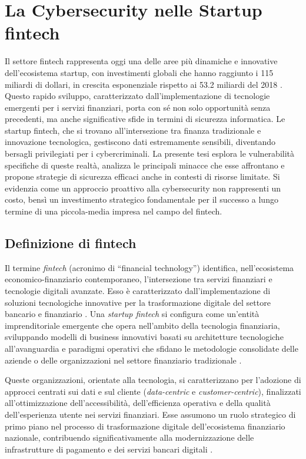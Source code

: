 \section{La Cybersecurity nelle Startup fintech}

Il settore fintech rappresenta oggi una delle aree più dinamiche e innovative dell'ecosistema startup, con investimenti globali che hanno raggiunto i 115 miliardi di dollari, in crescita esponenziale rispetto ai 53.2 miliardi del 2018 \cite{gartnerfintech}. Questo rapido sviluppo, caratterizzato dall'implementazione di tecnologie emergenti per i servizi finanziari, porta con sé non solo opportunità senza precedenti, ma anche significative sfide in termini di sicurezza informatica. Le startup fintech, che si trovano all'intersezione tra finanza tradizionale e innovazione tecnologica, gestiscono dati estremamente sensibili, diventando bersagli privilegiati per i cybercriminali. La presente tesi esplora le vulnerabilità specifiche di queste realtà, analizza le principali minacce che esse affrontano e propone strategie di sicurezza efficaci anche in contesti di risorse limitate. Si evidenzia come un approccio proattivo alla cybersecurity non rappresenti un costo, bensì un investimento strategico fondamentale per il successo a lungo termine di una piccola-media impresa nel campo del fintech.

\subsection{Definizione di fintech}

Il termine \textit{fintech} (acronimo di ``financial technology'') identifica, nell'ecosistema economico-finanziario contemporaneo, l'intersezione tra servizi finanziari e tecnologie digitali avanzate. Esso è caratterizzato dall'implementazione di soluzioni tecnologiche innovative per la trasformazione digitale del settore bancario e finanziario \cite{tecnofinanza}. Una \textit{startup fintech} si configura come un'entità imprenditoriale emergente che opera nell'ambito della tecnologia finanziaria, sviluppando modelli di business innovativi basati su architetture tecnologiche all'avanguardia e paradigmi operativi che sfidano le metodologie consolidate delle aziende o delle organizzazioni nel settore finanziario tradizionale \cite{fintech_numeri}.

Queste organizzazioni, orientate alla tecnologia, si caratterizzano per l'adozione di approcci centrati sui dati e sul cliente (\textit{data-centric} e \textit{customer-centric}), finalizzati all'ottimizzazione dell'accessibilità, dell'efficienza operativa e della qualità dell'esperienza utente nei servizi finanziari. Esse assumono un ruolo strategico di primo piano nel processo di trasformazione digitale dell'ecosistema finanziario nazionale, contribuendo significativamente alla modernizzazione delle infrastrutture di pagamento e dei servizi bancari digitali \cite{tecnofinanza}.

